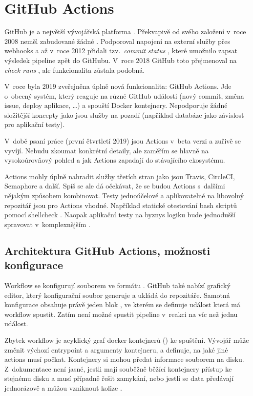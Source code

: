 \section{GitHub Actions}
    GitHub je  a největší vývojářská platforma \cite{github-about}. Překvapivě od svého založení v~roce 2008 neměl zabudované žádné \CI. Podporoval napojení na externí služby přes webhooks a až v~roce 2012 přidali tzv.~\textit{commit status }, které umožnilo \CI zapsat výsledek pipeline zpět do GitHubu. V~roce 2018 GitHub toto přejmenoval na \textit{check runs }, ale funkcionalita zůstala podobná.

    V~roce byla 2019 zveřejněna úplně nová funkcionalita: GitHub Actions. Jde o~obecný systém, který reaguje na různé GitHub události (nový commit, změna issue, deploy aplikace, \ldots) a spouští Docker kontejnery. Nepodporuje žádné složitější koncepty jako jsou služby na pozadí (například databáze jako závislost pro aplikační testy).

    V~době psaní práce (první čtvrtletí 2019) jsou Actions v~beta verzi a zuřivě se vyvíjí. Nebudu zkoumat konkrétní detaily, ale zaměřím se hlavně na vysokoúrovňový pohled a jak Actions zapadají do stávajícího ekosystému.

    Actions mohly úplně nahradit služby třetích stran jako jsou Travis, CircleCI, Semaphore a další. Spíš se ale dá očekávat, že se budou Actions s~dalšími \CI nějakým způsobem kombinovat. Testy jednoúčelové a aplikovatelné na libovolný repozitář jsou pro Actions vhodné. Například statické otestování bash skriptů pomocí shellcheck \cite{ga-shellcheck}. Naopak aplikační testy na byznys logiku bude jednodušší spravovat v~komplexnějším \CI.

    \subsection{Architektura GitHub Actions, možnosti konfigurace}
        Workflow se konfigurují souborem  ve formátu . GitHub také nabízí grafický editor, který konfigurační soubor generuje a ukládá do repozitáře. Samotná konfigurace obsahuje právě jeden blok , ve kterém se definuje  událost která má workflow spustit. Zatím není možné spustit pipeline v~reakci na víc než jednu událost.

        Zbytek workflow je acyklický graf docker kontejnerů () ke spuštění. Vývojář může změnit výchozí entrypoint a argumenty kontejneru, a definuje, na jaké jiné actions musí počkat. Kontejnery si mohou předat informace souborem na disku. Z~dokumentace není jasné, jestli mají souběžně běžící kontejnery přístup ke stejnému disku a musí případně řešit zamykání, nebo jestli se data předávají jednorázově a můžou vzniknout kolize \cite{ga-fs}.

